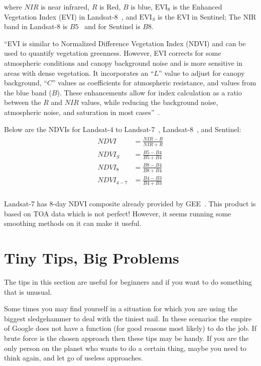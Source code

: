 \documentclass{article}
\newcommand{\NDVI}{N\!D\!V\!I}
\newcommand{\NIR}{N\!I\!R}
\begin{document}
\noindent where $NIR$ is near infrared, $R$ is Red,
$B$ is blue, 
$\text{EVI}_8$ is the Enhanced Vegetation Index (EVI) 
in Landsat-8~\cite{Landsat8EVI}, 
and $\text{EVI}_S$
is the EVI in Sentinel; The NIR band in
Landsat-8 is $B5$~\cite{L8BandNames}
and for Sentinel is $B8$.

``EVI is similar to Normalized Difference 
Vegetation Index (NDVI) and can be used 
to quantify vegetation greenness. However, 
EVI corrects for some atmospheric conditions 
and canopy background noise and is more 
sensitive in areas with dense vegetation. 
It incorporates an ``$L$'' value to adjust for 
canopy background, ``$C$'' values as coefficients 
for atmospheric resistance, and values from 
the blue band ($B$).  These enhancements allow 
for index calculation as a ratio between 
the $R$ and $NIR$ values, while reducing the 
background noise, atmospheric noise, and 
saturation in most cases''~\cite{Landsat8EVI}.

Below are the NDVIs for 
Landsat-4 to Landsat-7~\cite{Landsat4NDVI},
Landsat-8~\cite{Landsat4NDVI}, and Sentinel:
\begin{gather}
\label{eq:NDVILandsat8}
\begin{aligned}
\NDVI &= \frac{\NIR - R}{\NIR + R}\\
\NDVI_S &= \frac{B5 - B4}{B5 + B4}\\
\NDVI_8 &= \frac{B8 - B4}{B8 + B4} \\
\NDVI_{4-7} &= \frac{B4 - B3}{B4 + B3} \\
\end{aligned}
\end{gather}

Landsat-7 has 8-day NDVI composite already provided 
by GEE~\cite{Landsat7NDVIComposite}. This product
is based on TOA data which is not perfect! However,
it seems running some smoothing methods on it can
make it useful.


\section{Tiny Tips, Big Problems}
\label{sec:Tiny-Tips-Big-Problems}
The tips in this section are useful for beginners and
if you want to do something that is unusual.

Some times you may find yourself in a situation
for which you are using the biggest sledgehammer to deal
with the tiniest nail. In these scenarios the empire of Google
does not have a function (for good reasons most likely) to do the job. 
If brute force is the chosen approach then these tips may be handy. 
If you are the only person on the planet who wants
to do a certain thing, maybe you need to think again,
and let go of useless approaches.
\end{document}

